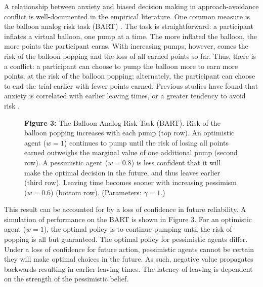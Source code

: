 \documentclass[11pt]{article} %
\begin{document}
A relationship between anxiety and biased decision making in approach-avoidance conflict is well-documented in the empirical literature. One common measure is the balloon analog risk task (BART) \citep{Lejuez2002}. The task is straightforward: a participant inflates a virtual balloon, one pump at a time. The more inflated the balloon, the more points the participant earns. With increasing pumps, however, comes the risk of the balloon popping and the loss of all earned points so far. Thus, there is a conflict: a participant can choose to pump the balloon more to earn more points, at the risk of the balloon popping; alternately, the participant can choose to end the trial earlier with fewer points earned. Previous studies have found that anxiety is correlated with earlier leaving times, or a greater tendency to avoid risk \cite{Maner2007, Giorgetta2012}.

\begin{figure}
  \centerline{%
  }
  \par \textbf{Figure 3:} The Balloon Analog Risk Task (BART). Risk of the balloon popping increases with each pump (top row). An optimistic agent ($w=1$) continues to pump until the risk of losing all points earned outweighs the marginal value of one additional pump (second row). A pessimistic agent ($w=0.8$) is less confident that it will make the optimal decision in the future, and thus leaves earlier (third row). Leaving time becomes sooner with increasing pessimism ($w=0.6$) (bottom row). (Parameters: $\gamma = 1$.)
\end{figure}

This result can be accounted for by a loss of confidence in future reliability. A simulation of performance on the BART is shown in Figure 3. For an optimistic agent ($w=1$), the optimal policy is to continue pumping until the risk of popping is all but guaranteed. The optimal policy for pessimistic agents differ. Under a loss of confidence for future action, pessimistic agents cannot be certain they will make optimal choices in the future. As such, negative value propagates backwards resulting in earlier leaving times. The latency of leaving is dependent on the strength of the pessimistic belief.
\end{document}
